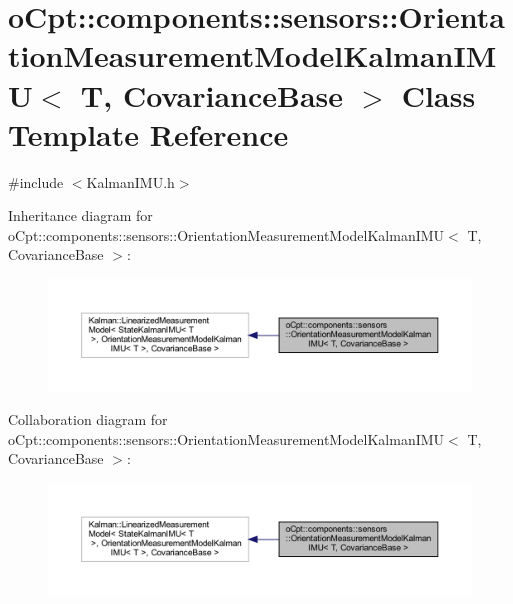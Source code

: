 \hypertarget{classo_cpt_1_1components_1_1sensors_1_1_orientation_measurement_model_kalman_i_m_u}{}\section{o\+Cpt\+:\+:components\+:\+:sensors\+:\+:Orientation\+Measurement\+Model\+Kalman\+I\+MU$<$ T, Covariance\+Base $>$ Class Template Reference}
\label{classo_cpt_1_1components_1_1sensors_1_1_orientation_measurement_model_kalman_i_m_u}


{\ttfamily \#include $<$Kalman\+I\+M\+U.\+h$>$}



Inheritance diagram for o\+Cpt\+:\+:components\+:\+:sensors\+:\+:Orientation\+Measurement\+Model\+Kalman\+I\+MU$<$ T, Covariance\+Base $>$\+:
\nopagebreak
\begin{figure}[H]
\begin{center}
\leavevmode
\includegraphics[width=350pt]{classo_cpt_1_1components_1_1sensors_1_1_orientation_measurement_model_kalman_i_m_u__inherit__graph}
\end{center}
\end{figure}


Collaboration diagram for o\+Cpt\+:\+:components\+:\+:sensors\+:\+:Orientation\+Measurement\+Model\+Kalman\+I\+MU$<$ T, Covariance\+Base $>$\+:
\nopagebreak
\begin{figure}[H]
\begin{center}
\leavevmode
\includegraphics[width=350pt]{classo_cpt_1_1components_1_1sensors_1_1_orientation_measurement_model_kalman_i_m_u__coll__graph}
\end{center}
\end{figure}
